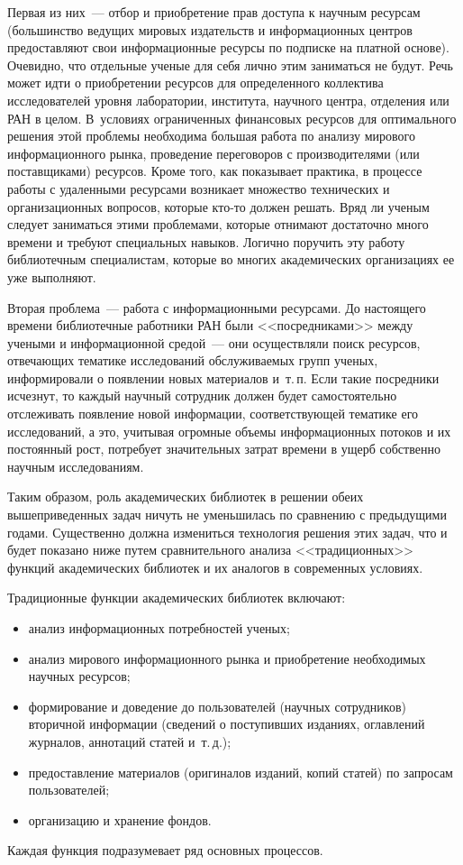 \begin{multicols}{2}
   Первая из них~--- отбор и приобретение прав доступа к научным ресурсам 
(большинство ведущих мировых издательств и информационных центров предоставляют 
свои информационные ресурсы по подписке на платной основе). Очевидно, что отдельные 
ученые для себя лично этим заниматься не будут. Речь может идти о приобретении 
ресурсов для определенного коллектива исследователей уровня лаборатории, института, 
научного центра, отделения или РАН в целом. В~условиях ограниченных финансовых 
ресурсов для оптимального решения этой проблемы необходима большая работа по 
анализу мирового информационного рынка, проведение переговоров с производителями 
(или поставщиками) ресурсов. Кроме того, как показывает практика, в процессе работы с 
удаленными ресурсами возникает множество технических и организационных вопросов, 
которые кто-то должен решать. Вряд ли ученым следует заниматься этими проблемами, 
которые отнимают достаточно много времени и требуют специальных навыков. Логично 
поручить эту работу библиотечным специалистам, которые во многих академических 
организациях ее уже выполняют. 
   
   Вторая проблема~--- работа с информационными ресурсами. До настоящего времени 
библиотечные работники РАН были <<посредниками>> между учеными и 
информационной средой~--- они осуществляли поиск ресурсов, отвечающих тематике 
исследований обслуживаемых групп ученых, информировали о появлении новых 
материалов и~т.\,п. Если такие посредники исчезнут, то каждый научный сотрудник 
должен будет самостоятельно отслеживать появление новой информации, 
соответствующей тематике его исследований, а это, учитывая огромные объемы 
информационных потоков и их постоянный рост, потребует значительных затрат времени 
в ущерб собственно научным исследованиям. 
   
   Таким образом, роль академических библиотек в решении обеих вышеприведенных 
задач ничуть не уменьшилась по сравнению с предыдущими годами. Существенно должна 
измениться технология решения этих задач, что и будет показано ниже путем 
сравнительного анализа <<традиционных>> функций академических библиотек и их 
аналогов в современных условиях. 
   
   Традиционные функции академических биб\-лиотек включают: 
   \begin{itemize}
\item анализ информационных потребностей ученых; 
\item анализ мирового информационного рынка и приобретение необходимых научных 
ресурсов; 
\item формирование и доведение до пользователей (научных сотрудников) вторичной 
информации (сведений о поступивших изданиях, оглав\-ле\-ний журналов, аннотаций статей и~т.\,д.); 
\item предоставление материалов (оригиналов изданий, копий статей)
по запросам пользователей; 
\item организацию и хранение фондов. 
\end{itemize}
Каждая функция подразумевает ряд основных процессов. 


\end{multicols}
